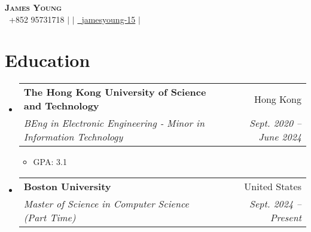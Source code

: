 \documentclass[letterpaper,12pt]{article}
\makeatletter
\newcommand{\resumeItem}[1]{
  \item\small{
    {#1 \vspace{-2pt}}
  }
}
\newcommand{\resumeSubheading}[4]{
  \vspace{-2pt}\item
    \begin{tabular*}{0.97\textwidth}[t]{l@{\extracolsep{\fill}}r}
      \textbf{#1} & #2 \\
      \textit{\small#3} & \textit{\small #4} \\
    \end{tabular*}\vspace{-7pt}
}
\newcommand{\resumeSubHeadingListStart}{\begin{itemize}[leftmargin=0.05in, label={}]}
\newcommand{\resumeSubHeadingListEnd}{\end{itemize}}
\newcommand{\resumeItemListStart}{\begin{itemize}}
\newcommand{\resumeItemListEnd}{\end{itemize}\vspace{-5pt}}
\makeatother
\begin{document}
\begin{center}
    \textbf{\Huge \scshape James Young} \\ \vspace{2pt}
    \small  \faPhone\ {+852 95731718} $|$ 
    \href{mailto:jyyoungaa@connect.ust.hk}{} $|$ 
    \href{https://github.com/jamesyoung-15} {\faGithub\ {jamesyoung-15}} $|$
    \href{https://linkedin.com/in/jamesyyoung}{}
\end{center}


\section{Education}
  \resumeSubHeadingListStart
    \resumeSubheading
      {The Hong Kong University of Science and Technology}{Hong Kong}
      {BEng in Electronic Engineering - Minor in Information Technology}{Sept. 2020 -- June 2024}
      \resumeItemListStart
       \resumeItem{GPA: 3.1}
       \resumeItemListEnd
       \vspace{-16pt}
  \resumeSubHeadingListEnd
  \resumeSubHeadingListStart
    \resumeSubheading
      {Boston University}{United States}
      {Master of Science in Computer Science (Part Time)}{Sept. 2024 -- Present}
  \resumeSubHeadingListEnd

\end{document}
